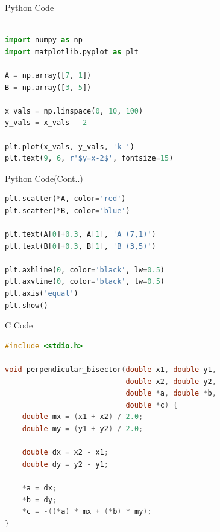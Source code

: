 \documentclass{beamer}
\begin{document}
\begin{frame}[fragile]{Python Code}
\begin{lstlisting}[language=Python]

import numpy as np
import matplotlib.pyplot as plt

A = np.array([7, 1])
B = np.array([3, 5])

x_vals = np.linspace(0, 10, 100)
y_vals = x_vals - 2

plt.plot(x_vals, y_vals, 'k-')
plt.text(9, 6, r'$y=x-2$', fontsize=15)

\end{lstlisting}
\end{frame}

\begin{frame}[fragile]{Python Code(Cont..)}
\begin{lstlisting}[language=Python]
plt.scatter(*A, color='red')
plt.scatter(*B, color='blue')

plt.text(A[0]+0.3, A[1], 'A (7,1)')
plt.text(B[0]+0.3, B[1], 'B (3,5)')

plt.axhline(0, color='black', lw=0.5)
plt.axvline(0, color='black', lw=0.5)
plt.axis('equal')
plt.show()
\end{lstlisting}
\end{frame}

\begin{frame}[fragile]{C Code}
\begin{lstlisting}[language=C]
#include <stdio.h>

void perpendicular_bisector(double x1, double y1,
                            double x2, double y2,
                            double *a, double *b,
                            double *c) {
    double mx = (x1 + x2) / 2.0;
    double my = (y1 + y2) / 2.0;

    double dx = x2 - x1;
    double dy = y2 - y1;

    *a = dx;
    *b = dy;
    *c = -((*a) * mx + (*b) * my);
}
\end{lstlisting}
\end{frame}
\end{document}
